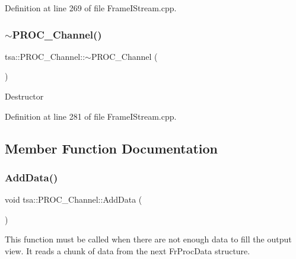 Definition at line 269 of file Frame\+I\+Stream.\+cpp.

\mbox{\label{classtsa_1_1_p_r_o_c___channel_acba6a69209ee63e13427046085d2be8d}} 
\subsubsection{\texorpdfstring{$\sim$\+P\+R\+O\+C\+\_\+\+Channel()}{~PROC\_Channel()}}
{\footnotesize\ttfamily tsa\+::\+P\+R\+O\+C\+\_\+\+Channel\+::$\sim$\+P\+R\+O\+C\+\_\+\+Channel (\begin{DoxyParamCaption}{ }\end{DoxyParamCaption})\hspace{0.3cm}{\ttfamily [virtual]}}

Destructor 

Definition at line 281 of file Frame\+I\+Stream.\+cpp.



\subsection{Member Function Documentation}
\mbox{\label{classtsa_1_1_p_r_o_c___channel_ab4f986f7829c52ca6c0d8c244be7c617}} 
\subsubsection{\texorpdfstring{Add\+Data()}{AddData()}}
{\footnotesize\ttfamily void tsa\+::\+P\+R\+O\+C\+\_\+\+Channel\+::\+Add\+Data (\begin{DoxyParamCaption}{ }\end{DoxyParamCaption})\hspace{0.3cm}{\ttfamily [virtual]}}

This function must be called when there are not enough data to fill the output view. It reads a chunk of data from the next Fr\+Proc\+Data structure. 

